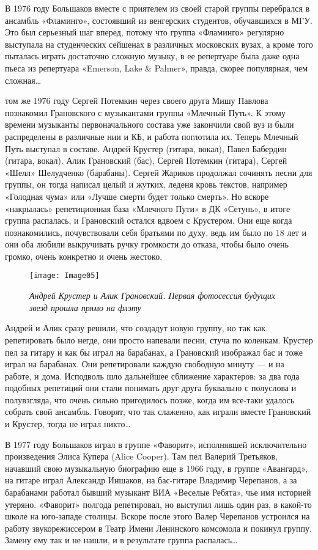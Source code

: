 \documentclass[16pt,a5paper,oneside]{book}
\begin{document}
В 1976 году Большаков вместе с приятелем из своей старой группы перебрался в ансамбль «Фламинго», состоявший из
венгерских студентов, обучавшихся в МГУ. Это был серьезный шаг вперед, потому что группа «Фламинго» регулярно выступала
на студенческих сейшенах в различных московских вузах, а кроме того пыталась играть достаточно сложную музыку, в ее
репертуаре была даже одна пьеса из репертуара «Emerson, Lake \& Palmer», правда, скорее популярная, чем сложная\ldots

 том же 1976 году Сергей Потемкин через своего друга Мишу Павлова познакомил Грановского с музыкантами группы
«Млечный Путь». К этому времени музыканты первоначального состава уже закончили свой вуз и были распределены в различные
нии и КБ, и работа поглотила их. Теперь Млечный Путь выступал в составе. Андрей Крустер (гитара, вокал), Павел Бабердин
(гитара, вокал). Алик Грановский (бас), Сергей Потемкин (гитара), Сергей «Шелл» Шелудченко (барабаны). Сергей Жариков
продолжал сочинять песни для группы, он тогда написал целый и жутких, леденя кровь текстов, например «Голодная чума» или
«Лучше смерти будет только смерть». Но вскоре «накрылась» репетиционная база «Млечного Пути» в ДК «Сетунь», в итоге
группа распалась, и Грановский остался вдвоем с Крустером. Они еще когда познакомились, почувствовали себя братьями по
духу, ведь им было по 18 лет и они оба любили выкручивать ручку громкости до отказа, чтобы было очень громко, очень
конкретно и очень жестоко.

\begin{figure}
    \centering
    \texttt{[image: Image05]}
    \caption{\textit{Андрей Крустер и Алик Грановский. Первая фотосессия будущих звезд прошла прямо на флэту}}
\end{figure}

Андрей и Алик сразу решили, что создадут новую группу, но так как репетировать было негде, они просто напевали песни,
стуча по коленкам. Крустер пел за гитару и как бы играл на барабанах, а Грановский изображал бас и тоже играл на
барабанах. Они репетировали каждую свободную минуту — и на работе, и дома. Исподволь шло дальнейшее сближение
характеров: за два года подобных репетиций они стали понимать друг друга буквально с полуслова и полувзгляда, что очень
сильно пригодилось позже, когда им все-таки удалось собрать свой ансамбль. Говорят, что так слаженно, как играли вместе
Грановский и Крустер, тогда не играл никто\ldots

В 1977 году Большаков играл в группе «Фаворит», исполнявшей исключительно произведения Элиса Купера (Alice Cooper). Там
пел Валерий Третьяков, начавший свою музыкальную биографию еще в 1966 году, в группе «Авангард», на гитаре играл
Александр Иншаков, на бас-гитаре Владимир Черепанов, а за барабанами работал бывший музыкант ВИА «Веселые Ребята», чье
имя историей утеряно. «Фаворит» полгода репетировал, но выступил лишь один раз, в какой-то школе на юго-западе столицы.
Вскоре после этого Валер Черепанов устроился на работу звукорежиссером в Театр Имени Ленинского комсомола и покинул
группу. Замену ему так и не нашли, и в результате группа распалась\ldots
\end{document}
